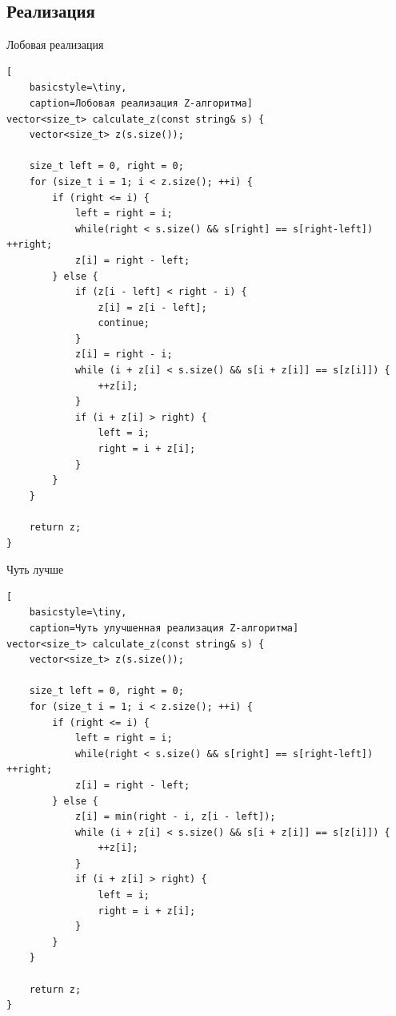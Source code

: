 \documentclass{beamer}
\theoremstyle{definition}
\begin{document}
\subsection{Реализация}

\begin{frame}[fragile]{Лобовая реализация}

\begin{lstlisting}[
	basicstyle=\tiny, 
	caption=Лобовая реализация Z-алгоритма]
vector<size_t> calculate_z(const string& s) {
    vector<size_t> z(s.size());  

    size_t left = 0, right = 0;
    for (size_t i = 1; i < z.size(); ++i) {
        if (right <= i) {     
            left = right = i;
            while(right < s.size() && s[right] == s[right-left]) ++right;
            z[i] = right - left;
        } else {
            if (z[i - left] < right - i) {
                z[i] = z[i - left];
                continue;
            }
            z[i] = right - i;
            while (i + z[i] < s.size() && s[i + z[i]] == s[z[i]]) {
                ++z[i];
            }
            if (i + z[i] > right) {
                left = i;
                right = i + z[i];
            }
        }
    }

    return z;
}
\end{lstlisting}

\end{frame}

\begin{frame}[fragile]{Чуть лучше}

\begin{lstlisting}[
	basicstyle=\tiny, 
	caption=Чуть улучшенная реализация Z-алгоритма]
vector<size_t> calculate_z(const string& s) {
    vector<size_t> z(s.size());

    size_t left = 0, right = 0;
    for (size_t i = 1; i < z.size(); ++i) {
        if (right <= i) {
            left = right = i;
            while(right < s.size() && s[right] == s[right-left]) ++right;
            z[i] = right - left;
        } else {
            z[i] = min(right - i, z[i - left]);
            while (i + z[i] < s.size() && s[i + z[i]] == s[z[i]]) {
                ++z[i];
            }
            if (i + z[i] > right) {
                left = i;
                right = i + z[i];
            }
        }
    }

    return z;
}

\end{lstlisting}

\end{frame}
\end{document}

